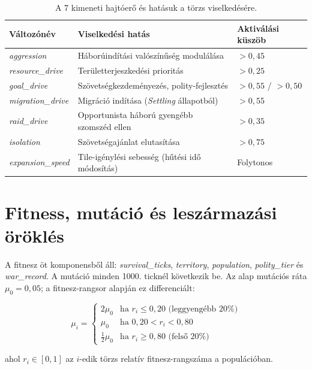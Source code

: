 \begin{table}[h]
  \centering
  \caption{A 7 kimeneti hajtóerő és hatásuk a törzs viselkedésére.}
  \label{tab:neurosim-outputs}
  \begin{tabular}{lll}
    \hline
    \textbf{Változónév} & \textbf{Viselkedési hatás} & \textbf{Aktiválási küszöb} \\
    \hline
    \textit{aggression}      & Háborúindítási valószínűség modulálása       & $> 0{,}45$ \\
    \textit{resource\_drive} & Területterjeszkedési prioritás                & $> 0{,}25$ \\
    \textit{goal\_drive}     & Szövetségkezdeményezés, polity-fejlesztés     & $> 0{,}55$ / $> 0{,}50$ \\
    \textit{migration\_drive}& Migráció indítása (\textit{Settling} állapotból) & $> 0{,}55$ \\
    \textit{raid\_drive}     & Opportunista háború gyengébb szomszéd ellen  & $> 0{,}35$ \\
    \textit{isolation}       & Szövetségajánlat elutasítása                 & $> 0{,}75$ \\
    \textit{expansion\_speed}& Tile-igénylési sebesség (hűtési idő módosítás) & Folytonos \\
    \hline
  \end{tabular}
\end{table}

\section{Fitness, mutáció és leszármazási öröklés}

A fitnesz öt komponensből áll: \textit{survival\_ticks}, \textit{territory}, \textit{population}, \textit{polity\_tier} és \textit{war\_record}. A mutáció minden 1000. ticknél következik be. Az alap mutációs ráta $\mu_0 = 0{,}05$; a fitnesz-rangsor alapján ez differenciált:

\begin{equation}
\mu_i =
\begin{cases}
2\mu_0 & \text{ha } r_i \leq 0{,}20 \text{ (leggyengébb 20\%)} \\
\mu_0  & \text{ha } 0{,}20 < r_i < 0{,}80 \\
\tfrac{1}{2}\mu_0 & \text{ha } r_i \geq 0{,}80 \text{ (felső 20\%)}
\end{cases}
\end{equation}

ahol $r_i \in [0,1]$ az $i$-edik törzs relatív fitnesz-rangszáma a populációban.

